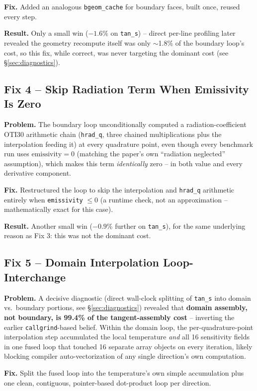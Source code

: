 \documentclass[11pt]{article}
\begin{document}
\textbf{Fix.} Added an analogous \texttt{bgeom\_cache} for boundary
faces, built once, reused every step.

\textbf{Result.} Only a small win ($-1.6\%$ on \texttt{tan\_s}) -- direct
per-line profiling later revealed the geometry recompute itself was only
$\sim$1.8\% of the boundary loop's cost, so this fix, while correct, was
never targeting the dominant cost (see \S\ref{sec:diagnostics}).

\subsection{Fix 4 -- Skip Radiation Term When Emissivity Is Zero}
\textbf{Problem.} The boundary loop unconditionally computed a
radiation-coefficient OTI30 arithmetic chain (\texttt{hrad\_q}, three
chained multiplications plus the interpolation feeding it) at every
quadrature point, even though every benchmark run uses
$\text{emissivity}=0$ (matching the paper's own ``radiation neglected''
assumption), which makes this term \emph{identically} zero -- in both
value and every derivative component.

\textbf{Fix.} Restructured the loop to skip the interpolation and
\texttt{hrad\_q} arithmetic entirely when \texttt{emissivity} $\le 0$
(a runtime check, not an approximation -- mathematically exact for this
case).

\textbf{Result.} Another small win ($-0.9\%$ further on
\texttt{tan\_s}), for the same underlying reason as Fix 3: this was not
the dominant cost.

\subsection{Fix 5 -- Domain Interpolation Loop-Interchange}\label{sec:fix5}
\textbf{Problem.} A decisive diagnostic (direct wall-clock splitting of
\texttt{tan\_s} into domain vs.\ boundary portions, see
\S\ref{sec:diagnostics}) revealed that \textbf{domain assembly, not
boundary, is 99.4\% of the tangent-assembly cost} -- inverting the
earlier \texttt{callgrind}-based belief. Within the domain loop, the
per-quadrature-point interpolation step accumulated the local
temperature \emph{and} all 16 sensitivity fields in one fused loop that
touched 16 separate array objects on every iteration, likely blocking
compiler auto-vectorization of any single direction's own computation.

\textbf{Fix.} Split the fused loop into the temperature's own simple
accumulation plus one clean, contiguous, pointer-based dot-product loop
per direction.
\end{document}

